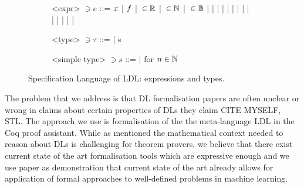 \documentclass[a4paper,UKenglish,cleveref, autoref, thm-restate]{lipics-v2021}
\begin{document}
\begin{figure}[t]
	\small
	\centering
	\begin{subfigure}[t]{0.45\textwidth}
		\begin{grammar}
			<expr> $\ni e$ ::=  
			$x$ | $f$ | \elReal $\: \in {\mathbb R}$ | \elNat $\: \in \mathbb{N}$ | \elBool $\: \in \mathbb{B}$
			\alt \App{\exprClass}{\exprClass} | \Lam{\identClass}{\typeClass}{\exprClass} | \Let{\identClass}{\typeClass}{\exprClass}{\exprClass}
			\alt \AndSymbol{} | \OrSymbol{} | \NotSymbol{} | \ImpliesSymbol{} | \AddSymbol{} | \NegSymbol{} | \MulSymbol{}
			\alt \NeqSymbol{} | \LeqSymbol{} | \GeqSymbol{} | \LeSymbol{} | \GeSymbol{} | \EqSymbol{}
			\alt \Seq{\exprClass}{\exprClass} | \AtSymbol{}

		\end{grammar}
	\end{subfigure}
	\hfill
	\begin{subfigure}[t]{0.5\textwidth}
		\begin{grammar}
			<type> $\ni \tau$  ::= 
			\FunType{s}{\typeClass} 
			| s
			
			<simple type> $\ni s$ ::= 
			\alt \BoolType
			\alt \RealType
			\alt {}   |    \hspace{3em} for $n \in \mathbb{N}$
		\end{grammar}
	\end{subfigure}
	\setlength{\belowcaptionskip}{-15pt} 
	\caption{Specification Language of LDL: expressions and types. %
	}
	\label{fig:syntax}
\end{figure}


The problem that we address is that DL formalisation papers are often unclear or wrong in claims about certain properties of DLs they claim CITE MYSELF, STL. The approach we use is formalisation of the the meta-language LDL in the Coq proof assistant. While as mentioned the mathematical context needed to reason about DLs is challenging for theorem provers, we believe that there exist current state of the art formalisation tools which are expressive enough and we use paper as demonstration that current state of the art already allows for application of formal approaches to well-defined problems in machine learning. 
\end{document}
